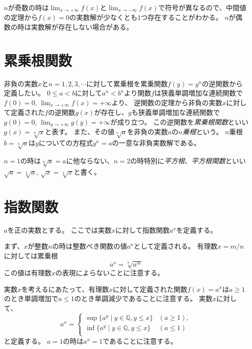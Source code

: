 \begin{remark}
$n$が奇数の時は$\lim_{x \to +\infty}f(x)$と$\lim_{x \to -\infty}f(x)$で符号が異なるので、中間値の定理から$f(x) = 0$の実数解が少なくとも$1$つ存在することがわかる。
$n$が偶数の時は実数解が存在しない場合がある。
\end{remark}

\section{累乗根関数}

非負の実数$x$と$n = 1, 2, 3, \cdots$に対して累乗根を累乗関数$f(y) = y^n$の逆関数から定義したい。
$0 \le a < b$に対して$a^n < b^n$より関数$f$は狭義単調増加な連続関数で$f(0) = 0$, $\lim_{x \to +\infty}f(x) = +\infty$より、
逆関数の定理から非負の実数$x$に対して定義された$f$の逆関数$g(x)$が存在し、$g$も狭義単調増加な連続関数で$g(0) = 0$, $\lim_{y \to +\infty}g(y) = +\infty$が成り立つ。
この逆関数を\emph{累乗根関数}といい$g(x) = \sqrt[n]{x}$と表す。
また、その値$\sqrt[n]{a}$を非負の実数$a$の\emph{$n$乗根}という。
$n$乗根$b = \sqrt[n]{a}$は$y$についての方程式$y^n = a$の一意な非負実数解である。

$n = 1$の時は$\sqrt[n]{a} = a$に他ならない、$n = 2$の時特別に\emph{平方根}、\emph{平方根関数}といい$\sqrt{a} = \sqrt[2]{a}$, $\sqrt{x} = \sqrt[2]{x}$と書く。

\section{指数関数}

$a$を正の実数とする。
ここでは実数$x$に対して指数関数$a^x$を定義する。

まず、$x$が整数$n$の時は整数べき関数の値$a^n$として定義される。
有理数$x = m/n$に対しては累乗根
$$
a^x = \sqrt[n]{a^m}
$$
この値は有理数$x$の表現によらないことに注意する。

実数$x$を考えるにあたって、有理数$x$に対して定義された関数$f(x) = a^x$は$a \ge 1$のとき単調増加で$a \le 1$のとき単調減少であることに注意する。
実数$x$に対して、
$$
a^x =
\begin{cases}
\sup\{ a^y \mid y \in \mathbb{Q}, y \le x \} & (a \ge 1), \\
\inf\{ a^y \mid y \in \mathbb{Q}, y \le x \} & (a \le 1) \\
\end{cases}
$$
と定義する。
$a = 1$の時は$a^x = 1$であることに注意する。

